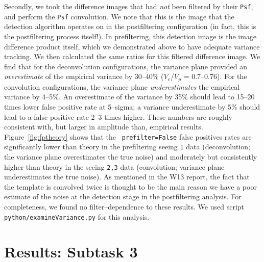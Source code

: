 \documentclass[DM,toc]{lsstdoc}
\begin{document}
Secondly, we took the difference images that had {\it not} been
filtered by their {\tt Psf}, and perform the {\tt Psf} convolution.
We note that this is the image that the detection algorithm operates
on in the postfiltering configuration (in fact, this is the
postfiltering process itself!).  In prefiltering, this detection image
is the image difference product itself, which we demonstrated above to
have adequate variance tracking.  We then calculated the same ratios
for this filtered difference image.  We find that for the
deconvolution configurations, the variance plane provided an {\it
  overestimate} of the empirical variance by 30--40\% ($V_e$/$V_p$ =
0.7--0.76).  For the convolution configurations, the variance plane
{\it underestimates} the empirical variance by 4--5\%.  An
overestimate of the variance by 35\% should lead to 15--20 times lower
false positive rate at 5--sigma; a variance underestimate by 5\%
should lead to a false positive rate 2--3 times higher.  These numbers
are roughly consistent with, but larger in amplitude than, empirical
results.  Figure~\ref{fig:fptheory} shows that the {\tt
  prefilter=False} false positives rates are significantly lower than
theory in the prefiltering seeing {\tt 1} data (deconvolution; the
variance plane overestimates the true noise) and moderately but
consistently higher than theory in the seeing {\tt 2,3} data
(convolution; variance plane underestimates the true noise).  As
mentioned in the W13 report, the fact that the template is convolved
twice is thought to be the main reason we have a poor estimate of the
noise at the detection stage in the postfiltering analysis.  For
completeness, we found no filter--dependence to these results.  We
used script {\tt python/examineVariance.py} for this analysis.

\section{Results: Subtask 3 \label{sec:task3}}
\end{document}

